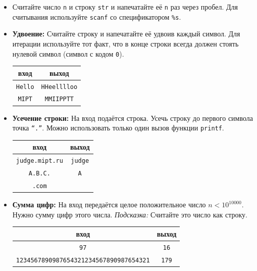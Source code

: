 \documentclass{article}
\begin{document}
\begin{itemize}
\item Считайте число \texttt{n} и строку \texttt{str} и напечатайте её \texttt{n} раз через пробел. Для считывания используйте \texttt{scanf} со спецификатором \texttt{\%s}.
\item \textbf{Удвоение:} Считайте строку и напечатайте её удвоив каждый символ. Для итерации используйте тот факт, что в конце строки всегда должен стоять нулевой символ (символ с кодом \texttt{0}).
\begin{center}
\begin{tabular}{ c | c }
 вход & выход \\ \hline
 \texttt{Hello} & \texttt{HHeelllloo}  \\ 
 \texttt{MIPT} & \texttt{MMIIPPTT}  \\ 
\end{tabular}
\end{center}

\item \textbf{Усечение строки:} На вход подаётся строка. Усечь строку до первого символа точка \texttt{``.''}. Можно использовать только один вызов функции \texttt{printf}.
\begin{center}
\begin{tabular}{ c | c }
 вход & выход \\ \hline
 \texttt{judge.mipt.ru} & \texttt{judge} \\
 \texttt{A.B.C.} & \texttt{A}  \\ 
 \texttt{.com}   &   \\ 
\end{tabular}
\end{center}

\item \textbf{Сумма цифр:} На вход передаётся целое положительное число $n < 10^{10000}$. Нужно сумму цифр этого числа.
\textit{Подсказка:} Считайте это число как строку.
\begin{center}
\begin{tabular}{ c | c }
 вход & выход \\ \hline
  \texttt{97} & \texttt{16} \\
  \texttt{1234567890987654321234567890987654321} & \texttt{179} \\
\end{tabular}
\end{center}

\end{itemize}

\newpage
\end{document}
